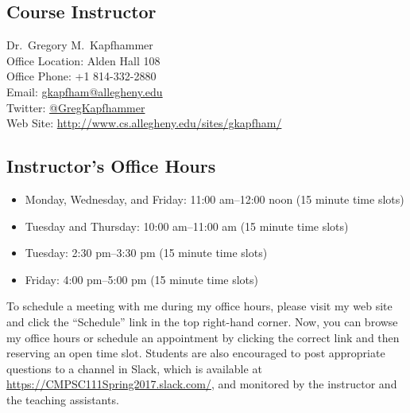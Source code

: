 

\usepackage[compact]{titlesec}



\subsection*{Course Instructor}
Dr.\ Gregory M.\ Kapfhammer\\
\noindent Office Location: Alden Hall 108 \\
\noindent Office Phone: +1 814-332-2880 \\
\noindent Email: \url{gkapfham@allegheny.edu} \\
\noindent Twitter: \url{@GregKapfhammer} \\
\noindent Web Site: \url{http://www.cs.allegheny.edu/sites/gkapfham/}

\subsection*{Instructor's Office Hours}

\begin{itemize}
  \itemsep0em

  \item Monday, Wednesday, and Friday: 11:00 am--12:00 noon (15 minute time slots)

  \item Tuesday and Thursday: 10:00 am--11:00 am (15 minute time slots)

  \item Tuesday: 2:30 pm--3:30 pm (15 minute time slots)

  \item Friday: 4:00 pm--5:00 pm (15 minute time slots)

\end{itemize}

\vspace*{-.1in}

\noindent To schedule a meeting with me during my office hours, please visit my web site and click the ``Schedule'' link
in the top right-hand corner. Now, you can browse my office hours or schedule an appointment by clicking the correct
link and then reserving an open time slot. Students are also encouraged to post appropriate questions to a channel in
Slack, which is available at \url{https://CMPSC111Spring2017.slack.com/}, and monitored by the instructor and the
teaching assistants.

